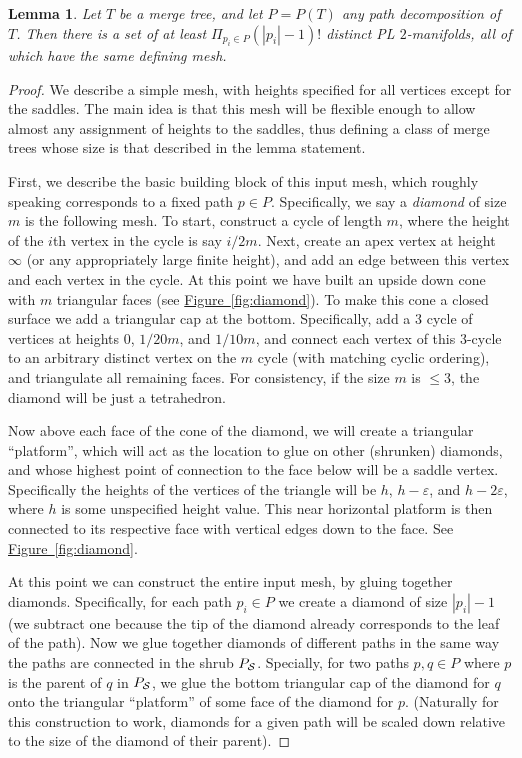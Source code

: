 \documentclass[11pt]{article}
\newtheorem{lemma}[theorem]{Lemma}
\theoremstyle{definition}
\newcommand{\eps}{\varepsilon}
\newcommand{\Fig}[1]{\hyperref[fig:#1]{Figure~\ref*{fig:#1}}} %
\begin{document}
\begin{lemma}
\label{lem:pathDecomp}
Let $T$ be a merge tree, and let $P = P(T)$ any path decomposition of $T$.  %
Then there is a set of at least $\Pi_{p_i\in P} (|p_i|-1)!$ distinct PL $2$-manifolds, all of which have the same defining mesh.
\end{lemma}
\begin{proof}
 We describe a simple mesh, with heights specified for all vertices except for the saddles.  The main idea is that 
 this mesh will be flexible enough to allow almost any assignment of heights to the saddles, thus defining a class of merge trees 
 whose size is that described in the lemma statement.
 
 First, we describe the basic building block of this input mesh, which roughly speaking corresponds to a fixed path $p\in P$.  
 Specifically, we say a \emph{diamond} of size $m$ is the following mesh.  To start, construct a cycle 
 of length $m$, where the height of the $i$th vertex in the cycle is say $i/2m$.  Next, create an apex vertex at height 
 $\infty$ (or any appropriately large finite height), and add an edge between this vertex and each vertex in the cycle.  At this point 
 we have built an upside down cone with $m$ triangular faces (see \Fig{diamond}). To make this cone a closed surface we add a triangular cap at the bottom. 
 Specifically, add a $3$ cycle of vertices at heights $0$, $1/20m$, and $1/10m$, and connect each vertex of this $3$-cycle to an arbitrary distinct 
 vertex on the $m$ cycle (with matching cyclic ordering), and triangulate all remaining faces.  For consistency, if the size $m$ is $\leq 3$, the diamond 
 will be just a tetrahedron.
 
 Now above each face of the cone of the diamond, we will create a triangular ``platform'', which will act as the location to glue on other (shrunken) diamonds, 
 and whose highest point of connection to the face below will be a saddle vertex.  Specifically the heights of the vertices of the triangle will be $h$, $h-\eps$, and $h-2\eps$, where 
 $h$ is some unspecified height value.  This near horizontal platform is then connected to its respective face with vertical edges down to the face. See \Fig{diamond}.
 
 At this point we can construct the entire input mesh, by gluing together diamonds.  
 Specifically, for each path $p_i\in P$ we create a diamond of size $|p_i|-1$ (we subtract one because the tip of the diamond already corresponds to the leaf of the path).
 Now we glue together diamonds of different paths in the same way the paths are connected in the shrub $P_{\mathcal{S}}$.  Specially, for two paths $p,q\in P$ where 
 $p$ is the parent of $q$ in $P_{\mathcal{S}}$, we glue the bottom triangular cap of the diamond for $q$ onto the triangular ``platform'' of some face of the diamond for $p$.
 (Naturally for this construction to work, diamonds for a given path will be scaled down relative to the size of the diamond of their parent).
 

\end{proof}
\end{document}
